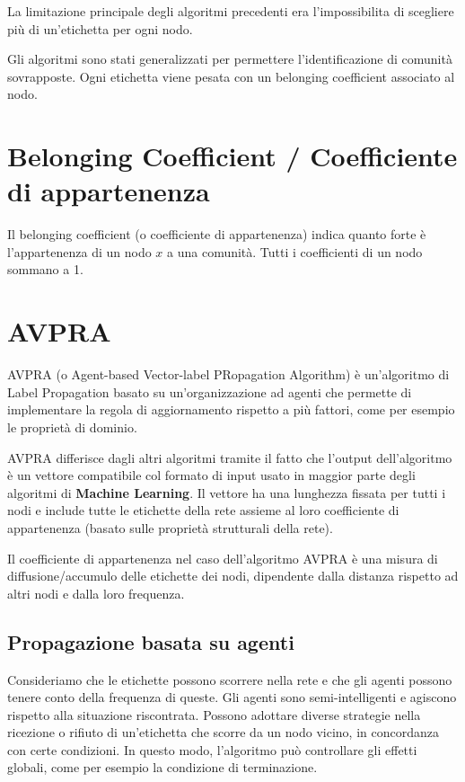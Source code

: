 \documentclass[a4paper,12pt]{report}
\begin{document}
	La limitazione principale degli algoritmi precedenti era l'impossibilita di scegliere più di un'etichetta per ogni nodo. 

	Gli algoritmi sono stati generalizzati per permettere l'identificazione di comunità sovrapposte. Ogni etichetta viene pesata con un belonging coefficient associato al nodo. 

	\section{Belonging Coefficient / Coefficiente di appartenenza}
	Il belonging coefficient (o coefficiente di appartenenza) indica quanto forte è l'appartenenza di un nodo $x$ a una comunità. Tutti i coefficienti di un nodo sommano a 1. \cite{gregory}

	\section{AVPRA}
	AVPRA (o Agent-based Vector-label PRopagation Algorithm) è un'algoritmo di Label Propagation basato su un'organizzazione ad agenti che permette di implementare la regola di aggiornamento rispetto a più fattori, come per esempio le proprietà di dominio. 

	AVPRA differisce dagli altri algoritmi tramite il fatto che l'output dell'algoritmo è un vettore compatibile col formato di input usato in maggior parte degli algoritmi di \textbf{Machine Learning}. Il vettore ha una lunghezza fissata per tutti i nodi e include tutte le etichette della rete assieme al loro coefficiente di appartenenza (basato sulle proprietà strutturali della rete).

	Il coefficiente di appartenenza nel caso dell'algoritmo AVPRA è una misura di diffusione/accumulo delle etichette dei nodi, dipendente dalla distanza rispetto ad altri nodi e dalla loro frequenza. \cite{avpra} 

		\subsection{Propagazione basata su agenti}
		Consideriamo che le etichette possono scorrere nella rete e che gli agenti possono tenere conto della frequenza di queste. Gli agenti sono semi-intelligenti e agiscono rispetto alla situazione riscontrata. Possono adottare diverse strategie nella ricezione o rifiuto di un'etichetta che scorre da un nodo vicino, in concordanza con certe condizioni. In questo modo, l'algoritmo può controllare gli effetti globali, come per esempio la condizione di terminazione.
\end{document}

